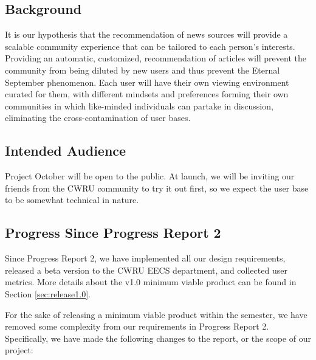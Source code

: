 \documentclass[11pt,letterpaper]{article}
\begin{document}
\subsection{Background}
It is our hypothesis that the recommendation of news sources will provide a scalable community experience that can be tailored to each person's interests.
Providing an automatic, customized, recommendation of articles will prevent the community from being diluted by new users and thus prevent the Eternal September phenomenon.
Each user will have their own viewing environment curated for them, with different mindsets and preferences forming their own communities in which like-minded individuals can partake in discussion, eliminating the cross-contamination of user bases.


\subsection{Intended Audience}
Project October will be open to the public.
At launch, we will be inviting our friends from the CWRU community to try it out first, so we expect the user base to be somewhat technical in nature.

\subsection{Progress Since Progress Report 2}
Since Progress Report 2, we have implemented all our design requirements, released a beta version to the CWRU EECS department, and collected user metrics. More details about the v1.0 minimum viable product can be found in Section \ref{sec:release1.0}.

For the sake of releasing a minimum viable product within the semester, we have removed some complexity from our requirements in Progress Report 2. Specifically, we have made the following changes to the report, or the scope of our project:
\end{document}
